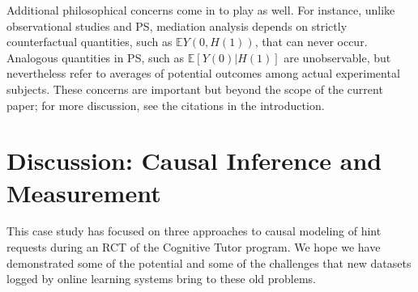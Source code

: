 \documentclass{article}\usepackage[]{graphicx}\usepackage[]{color}
\newcommand{\EE}{\mathbb{E}}
\begin{document}
Additional philosophical concerns come in to play as well.
For instance, unlike observational studies and PS, mediation analysis
depends on strictly counterfactual quantities, such as $\EE Y(0,H(1))$,
that can never occur.
Analogous quantities in PS, such as $\EE [Y(0)|H(1)]$ are
unobservable, but nevertheless refer to averages of potential outcomes
among actual experimental subjects.
These concerns are important but beyond the scope of the current
paper; for more discussion, see the citations in the introduction.




\section{Discussion: Causal Inference and Measurement}\label{sec:conclusion}
This case study has focused on three approaches to causal modeling of
hint requests during an RCT of the Cognitive Tutor program.
We hope we have demonstrated some of the potential and some of the
challenges that new datasets logged by online
learning systems bring to these old problems.
\end{document}
